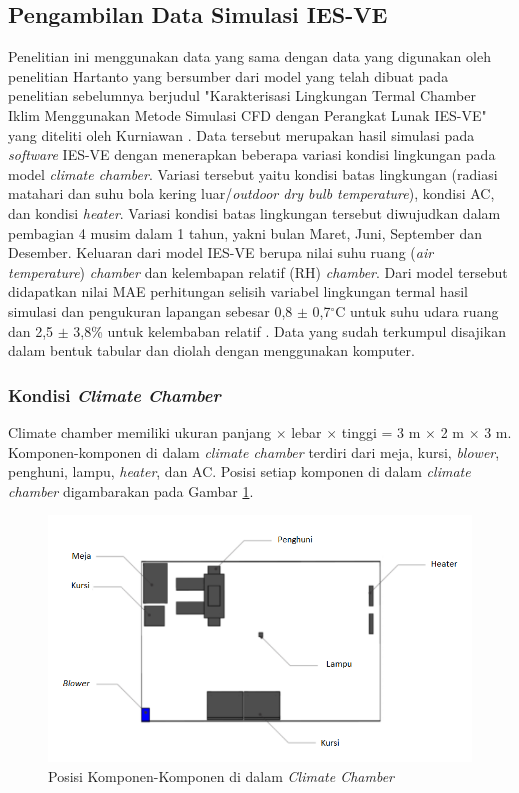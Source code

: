 \subsection{Pengambilan Data Simulasi IES-VE}
Penelitian ini menggunakan data yang sama dengan data yang digunakan oleh penelitian Hartanto \cite{skripsiTanto} yang bersumber dari model yang telah dibuat pada penelitian sebelumnya berjudul "Karakterisasi Lingkungan Termal Chamber Iklim Menggunakan Metode Simulasi CFD dengan Perangkat Lunak IES-VE" yang diteliti oleh Kurniawan \cite{skripsiIchfan}.  Data tersebut merupakan hasil simulasi pada \textit{software} IES-VE dengan menerapkan beberapa variasi kondisi lingkungan pada model \textit{climate chamber}. Variasi tersebut yaitu kondisi batas lingkungan (radiasi matahari dan suhu bola kering luar/\textit{outdoor dry bulb temperature}), kondisi AC, dan kondisi \textit{heater}. Variasi kondisi batas lingkungan tersebut diwujudkan dalam pembagian 4 musim dalam 1 tahun, yakni bulan Maret, Juni, September dan Desember. Keluaran dari model IES-VE berupa nilai suhu ruang (\textit{air temperature}) \textit{chamber} dan kelembapan relatif (RH) \textit{chamber}. Dari model tersebut didapatkan nilai MAE perhitungan selisih variabel lingkungan termal hasil simulasi dan pengukuran lapangan sebesar 0,8 $\pm$ 0,7$^{\circ}$C untuk suhu udara ruang dan 2,5 $\pm$ 3,8\% untuk kelembaban relatif \cite{skripsiIchfan}. Data yang sudah terkumpul disajikan dalam bentuk tabular dan diolah dengan menggunakan komputer.

\subsubsection{Kondisi \textit{Climate Chamber}}

Climate chamber memiliki ukuran panjang $\times$ lebar $\times$ tinggi = 3 m $\times$ 2 m $\times$ 3 m. Komponen-komponen di dalam \textit{climate chamber} terdiri dari meja, kursi, \textit{blower}, penghuni, lampu, \textit{heater}, dan AC. Posisi setiap komponen di dalam \textit{climate chamber} digambarakan pada Gambar \ref{fig:4:KondisiChamber}.

\begin{figure}[!h]
	\centering
	\includegraphics[width=1\textwidth]{figures/KondisiChamber}
	\caption{Posisi Komponen-Komponen di dalam \textit{Climate Chamber}}
	\label{fig:4:KondisiChamber}
\end{figure}


